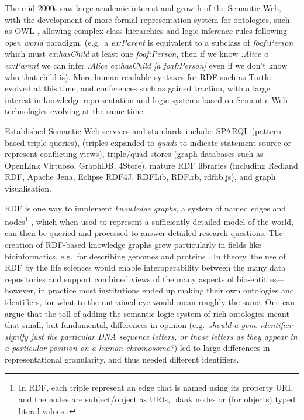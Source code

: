 The mid-2000s saw large academic interest and growth of the Semantic Web, with the development of more formal representation system for ontologies, such as OWL \cite{W3C 2012}, allowing complex class hierarchies and logic inference rules following \emph{open world} paradigm. (e.g.~a \emph{ex:Parent} is equivalent to a subclass of \emph{foaf:Person} which must \emph{ex:hasChild} at least one \emph{foaf:Person}, then if we know \emph{:Alice a ex:Parent} we can infer \emph{:Alice ex:hasChild {[}a foaf:Person{]}} even if we don't know who that child is). More human-readable syntaxes for RDF such as Turtle evolved at this time, and conferences such as  \cite{Horrocks 2022} gained traction, with a large interest in knowledge representation and logic systems based on Semantic Web technologies evolving at the same time.

Established Semantic Web services and standards include: SPARQL \cite{W3C 2013} (pattern-based triple queries),  \cite{Wood 2014} (triples expanded to \emph{quads} to indicate statement source or represent conflicting views), triple/quad stores (graph databases such as OpenLink Virtuoso, GraphDB, 4Store), mature RDF libraries (including Redland RDF, Apache Jena, Eclipse RDF4J, RDFLib, RDF.rb, rdflib.js), and graph visualisation.

RDF is one way to implement \emph{knowledge graphs}, a system of named edges and nodes\footnote{In RDF, each triple represent an edge that is named using its property URI, and the nodes are subject/object as URIs, blank nodes or (for objects) typed literal values \cite{Schreiber 2014}.} \cite{Nurdiati 2008}, which when used to represent a sufficiently detailed model of the world, can then be queried and processed to answer detailed research questions. The creation of RDF-based knowledge graphs grew particularly in fields like bioinformatics, e.g.~for describing genomes and proteins \cite{Goble 2008,Williams 2012}. In theory, the use of RDF by the life sciences would enable interoperability between the many data repositories and support combined views of the many aspects of bio-entities---however, in practice most institutions ended up making their own ontologies and identifiers, for what to the untrained eye would mean roughly the same. One can argue that the toll of adding the semantic logic system of rich ontologies meant that small, but fundamental, differences in opinion (e.g.~\emph{should a gene identifier signify just the particular DNA sequence letters, or those letters as they appear in a particular position on a human chromosome?}) led to large differences in representational granularity, and thus needed different identifiers.

